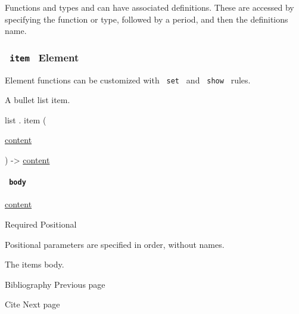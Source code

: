 \label{definitions-tooltip}
Functions and types and can have associated definitions. These are
accessed by specifying the function or type, followed by a period, and
then the definition\textquotesingle s name.

\subsubsection{\texorpdfstring{\texttt{\ item\ } {{ Element
}}}{ item   Element }}\label{definitions-item}

\label{definitions-item-element-tooltip}
Element functions can be customized with \texttt{\ set\ } and
\texttt{\ show\ } rules.

A bullet list item.

list { . } { item } (

{ \href{/docs/reference/foundations/content/}{content} }

) -\textgreater{} \href{/docs/reference/foundations/content/}{content}

\paragraph{\texorpdfstring{\texttt{\ body\ }}{ body }}\label{definitions-item-body}

\href{/docs/reference/foundations/content/}{content}

{Required} {{ Positional }}

\label{definitions-item-body-positional-tooltip}
Positional parameters are specified in order, without names.

The item\textquotesingle s body.

\href{/docs/reference/model/bibliography/}{\pandocbounded{}}

{ Bibliography } { Previous page }

\href{/docs/reference/model/cite/}{\pandocbounded{}}

{ Cite } { Next page }

